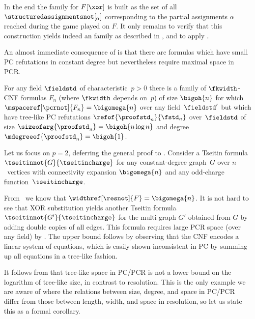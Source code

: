 \begin{ourproof}[sketch]
  In the end the \kextendible family for $F[\xor]$ is built as the set
  of all $\structuredassignmentsnot[_\alpha]$ corresponding to the partial
  assignments $\alpha$ reached during the game played on $F$.
  It only remains to verify that this construction yields indeed an
  \kextendibleNok family as described in ,
  and to apply .
\end{ourproof}

\label{sec:overview-separation}

An almost immediate consequence of  is that
there are formulas which have small PC refutations in constant
degree but nevertheless require maximal space in PCR.

\begin{theorem}
  \label{thm:separation}
%
  For any field $\fieldstd$
  of characteristic~$p>0$
  there is a family of
  \mbox{$\fkwidth$-CNF} formulas
  $F_n$
  (where $\fkwidth$ depends on~$p$)
  of size $\bigoh{n}$
  for which
%
  $\mspaceref[\pcrnot]{F_{n}}=\bigomega{n}$
  over any field~$\fieldstd'$ %
  but  which have tree-like PC refutations
  $\refof{\proofstd_n}{\fstd_n}$ 
  over~$\fieldstd$
  of size
  $\sizeofarg{\proofstd_n}=\bigoh{n\log n}$
  and degree
  $\mdegreeof{\proofstd_n}=\bigoh{1}$.
\end{theorem}


\begin{ourproof}[sketch]
  Let us focus on 
  $p=2$, deferring the general proof to  
   .
  Consider a Tseitin formula $\tseitinnot{G}{\tseitincharge}$ 
  for any constant-degree graph~$G$ over $n$~vertices
  with connectivity expansion $\bigomega{n}$
  and any odd-charge function~$\tseitincharge$.
  
  From~\cite{BW01ShortProofs}
  we know that
  $\widthref[\resnot]{F}=\bigomega{n}$.
  It is not hard to see that XOR substitution yields
  another Tseitin formula
  $\tseitinnot{G'}{\tseitincharge}$ 
  for the multi-graph $G'$ obtained from $G$ 
  by adding double copies of all edges.
  This formula requires large PCR space (over any field)
  by .
  The upper bound follows by observing that the CNF encodes a linear
  system of equations, which is easily shown inconsistent in PC by summing
  up all equations in a tree-like fashion.
\end{ourproof}

It follows from  that
tree-like space in PC/PCR is not %
a lower bound on the logarithm of %
tree-like size, in contrast to resolution. 
This is the only example we are aware of where the relations between
size, degree, and space in PC/PCR differ from those between length,
width, and space in resolution, so let us state this as a formal
corollary.


